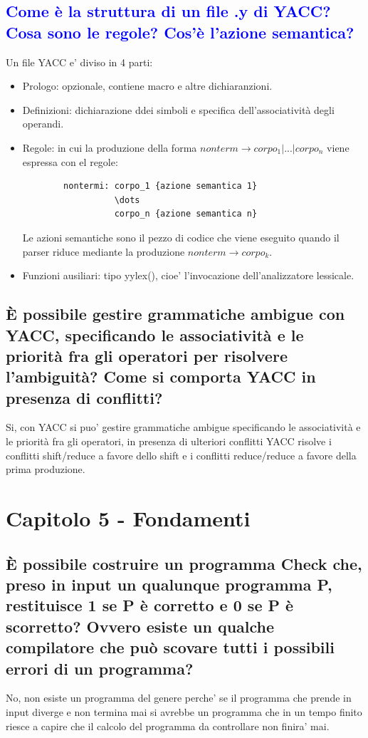 \documentclass{article}
\begin{document}
\subsection{\textcolor{blue}{{Come è la struttura di un file .y di YACC?} Cosa sono le regole? Cos'è l'azione semantica?}}
Un file YACC e' diviso in 4 parti:
\begin{itemize}
    \item Prologo: opzionale, contiene macro e altre dichiaranzioni.
    \item Definizioni: dichiarazione ddei simboli e specifica dell'associatività degli
          operandi.
    \item Regole: in cui la produzione della forma $nonterm \to corpo_1|...|corpo_n$
          viene espressa con el regole:
          \begin{verbatim}
        nontermi: corpo_1 {azione semantica 1}
                  \dots
                  corpo_n {azione semantica n}
    \end{verbatim}
          Le azioni semantiche sono il pezzo di codice che viene eseguito quando il
          parser riduce mediante la produzione $nonterm \to corpo_k$.
    \item Funzioni ausiliari: tipo yylex(), cioe' l'invocazione dell'analizzatore
          lessicale.
\end{itemize}
\subsection{È possibile gestire grammatiche ambigue con YACC, specificando le associatività e le priorità fra gli operatori per risolvere l'ambiguità?
    Come si comporta YACC in presenza di conflitti?}
Si, con YACC si puo' gestire grammatiche ambigue specificando le associatività
e le priorità fra gli operatori, in presenza di ulteriori conflitti YACC
risolve i conflitti shift/reduce a favore dello shift e i conflitti
reduce/reduce a favore della prima produzione.
\section{Capitolo 5 - Fondamenti}
\subsection{È possibile costruire un programma Check che, preso in input un qualunque programma P, restituisce 1 se P è corretto e 0 se P è scorretto?
    Ovvero esiste un qualche compilatore che può scovare tutti i possibili errori di un programma?}
No, non esiste un programma del genere perche' se il programma che prende in
input diverge e non termina mai si avrebbe un programma che in un tempo finito
riesce a capire che il calcolo del programma da controllare non finira' mai.
\end{document}
